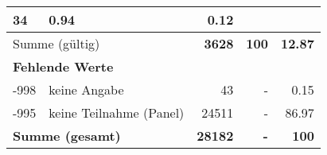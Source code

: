 \begin{longtable}{lXrrr}
       \num{34} &
       \num[round-mode=places,round-precision=2]{0,94} &
         \num[round-mode=places,round-precision=2]{0,12} \\
     \midrule
     \multicolumn{2}{l}{Summe (gültig)} &
       \textbf{\num{3628}} &
     \textbf{100} &
       \textbf{\num[round-mode=places,round-precision=2]{12,87}} \\
     \multicolumn{5}{l}{\textbf{Fehlende Werte}}\\
       -998 &
       keine Angabe &
         \num{43} &
        - &
         \num[round-mode=places,round-precision=2]{0,15} \\
       -995 &
       keine Teilnahme (Panel) &
         \num{24511} &
        - &
         \num[round-mode=places,round-precision=2]{86,97} \\
     \midrule
     \multicolumn{2}{l}{\textbf{Summe (gesamt)}} &
          \textbf{\num{28182}} &
        \textbf{-} &
        \textbf{100} \\
     \bottomrule
     \end{longtable}
     
